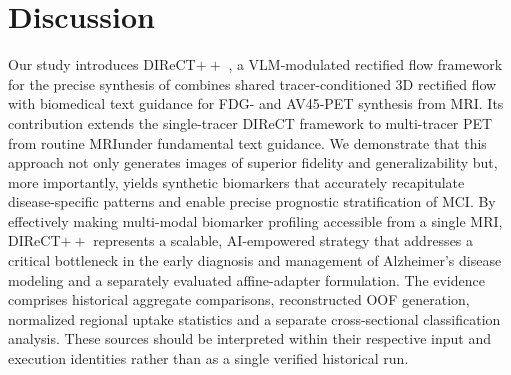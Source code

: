 \documentclass{article}
\providecommand{\DIFaddtex}[1]{{\protect\color{blue} \sf #1}} %
\providecommand{\DIFdeltex}[1]{{\protect\color{red} \scriptsize #1}} %
\providecommand{\DIFaddbegin}{} %
\providecommand{\DIFaddend}{} %
\providecommand{\DIFdelbegin}{} %
\providecommand{\DIFdelend}{} %
\providecommand{\DIFadd}[1]{\texorpdfstring{\DIFaddtex{#1}}{#1}} %
\providecommand{\DIFdel}[1]{\texorpdfstring{\DIFdeltex{#1}}{}} %
\newcommand{\DIFscaledelfig}{0.5}
\newlength{\DIFdelgraphicswidth} %
\newlength{\DIFdelgraphicsheight} %
\newcommand{\DIFaddincludegraphics}[2][]{{\color{blue}\fbox{\DIFOincludegraphics[#1]{#2}}}} %
\newcommand{\DIFdelincludegraphics}[2][]{%
\sbox{\DIFdelgraphicsbox}{\DIFOincludegraphics[#1]{#2}}%
\settoboxwidth{\DIFdelgraphicswidth}{\DIFdelgraphicsbox} %
\settoboxtotalheight{\DIFdelgraphicsheight}{\DIFdelgraphicsbox} %
\scalebox{\DIFscaledelfig}{%
\parbox[b]{\DIFdelgraphicswidth}{\usebox{\DIFdelgraphicsbox}\\[-\baselineskip] \rule{\DIFdelgraphicswidth}{0em}}\llap{\resizebox{\DIFdelgraphicswidth}{\DIFdelgraphicsheight}{%
\setlength{\unitlength}{\DIFdelgraphicswidth}%
\begin{picture}(1,1)%
\thicklines\linethickness{2pt} %
{\color[rgb]{1,0,0}\put(0,0){\framebox(1,1){}}}%
{\color[rgb]{1,0,0}\put(0,0){\line( 1,1){1}}}%
{\color[rgb]{1,0,0}\put(0,1){\line(1,-1){1}}}%
\end{picture}%
}\hspace*{3pt}}} %
} %
\DeclareRobustCommand{\DIFaddbegin}{\DIFOaddbegin \let\includegraphics\DIFaddincludegraphics} %
\DeclareRobustCommand{\DIFaddend}{\DIFOaddend \let\includegraphics\DIFOincludegraphics} %
\DeclareRobustCommand{\DIFdelbegin}{\DIFOdelbegin \let\includegraphics\DIFdelincludegraphics} %
\DeclareRobustCommand{\DIFdelend}{\DIFOaddend \let\includegraphics\DIFOincludegraphics} %
\begin{document}
\section{Discussion}
\DIFdelbegin \DIFdel{Our study introduces }\DIFdelend DIReCT$++$ \DIFdelbegin \DIFdel{, a VLM-modulated rectified flow framework for the precise synthesis of }\DIFdelend \DIFaddbegin \DIFadd{combines shared tracer-conditioned 3D rectified flow with biomedical text guidance for FDG- and AV45-PET synthesis from MRI. Its contribution extends the single-tracer DIReCT framework to }\DIFaddend multi-tracer \DIFdelbegin \DIFdel{PET from routine MRIunder fundamental text guidance. We demonstrate that this approach not only generates images of superior fidelity and generalizability but, more importantly, yields synthetic biomarkers that accurately recapitulate disease-specific patterns and enable precise prognostic stratification of MCI. By effectively making multi-modal biomarker profiling accessible from a single MRI, DIReCT$++$ represents a scalable, AI-empowered strategy that addresses a critical bottleneck in the early diagnosis and management of Alzheimer's disease}\DIFdelend \DIFaddbegin \DIFadd{modeling and a separately evaluated affine-adapter formulation. The evidence comprises historical aggregate comparisons, reconstructed OOF generation, normalized regional uptake statistics and a separate cross-sectional classification analysis. These sources should be interpreted within their respective input and execution identities rather than as a single verified historical run}\DIFaddend .
\end{document}
